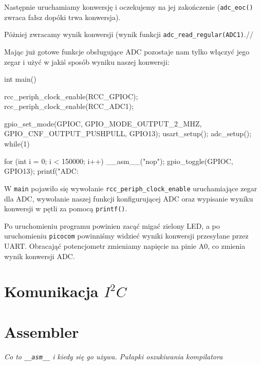 \documentclass{pdfBooklets}
\begin{document}
Następnie uruchamiamy konwersję i oczekujemy na jej zakończenie (\Verb$adc_eoc()$ zwraca fałsz dopóki trwa konwersja).

Póżniej zwracamy wynik konwersji (wynik funkcji \Verb$adc_read_regular(ADC1)$.//

Mając już gotowe funkcje obsługujące ADC pozostaje nam tylko włączyć jego zegar i użyć w jakiś sposób wyniku naszej konwersji:

\begin{CodeFrame*}[c]{}
int main(){
  rcc_periph_clock_enable(RCC_GPIOC);
  rcc_periph_clock_enable(RCC_ADC1);
  
  gpio_set_mode(GPIOC, GPIO_MODE_OUTPUT_2_MHZ,
		GPIO_CNF_OUTPUT_PUSHPULL, GPIO13);
  usart_setup();
  adc_setup();
  while(1){
    for (int i = 0; i < 150000; i++) __asm__("nop");
    gpio_toggle(GPIOC, GPIO13);
    printf("ADC: %
    
  }
}
\end{CodeFrame*}

W \Verb$main$ pojawiło się wywołanie \Verb$rcc_periph_clock_enable$ uruchamiające zegar dla ADC, wywołanie naszej funkcji
konfigurującej ADC oraz wypisanie wyniku konwersji w pętli za pomocą \Verb$printf()$.

Po uruchomieniu programu powinien zacąć migać zielony LED, a po uruchomieniu \Verb$picocom$ powinniśmy widzieć wyniki konwersji
przesyłane przez UART. Obracająć potencjometr zmieniamy napięcie na pinie A0, co zmienia wynik konwersji ADC.


\section{Komunikacja $I^2C$}

\section{Assembler}
\textit{Co to \Verb$__asm__$ i kiedy się go używa. Pułapki oszukiwania kompilatora}
\end{document}
